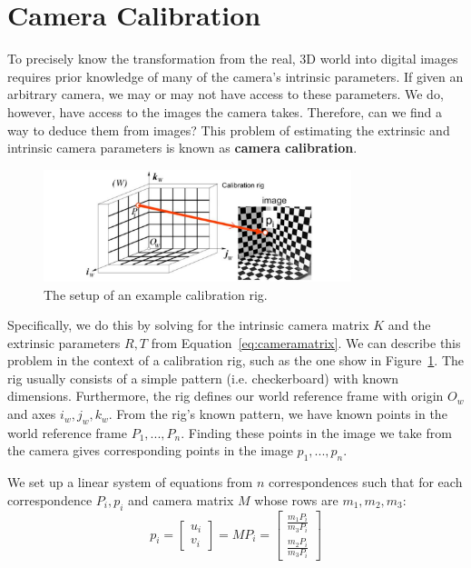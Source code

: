 \documentclass[a4paper, 12pt]{article}
\renewcommand\emph{\textbf}
\begin{document}
\section{Camera Calibration}
To precisely know the transformation from the real, 3D world into digital images requires prior knowledge of many of the camera's intrinsic parameters. If given an arbitrary camera, we may or may not have access to these parameters. We do, however, have access to the images the camera takes. Therefore, can we find a way to deduce them from images? This problem of estimating the extrinsic and intrinsic camera parameters is known as \emph{camera calibration}.

\begin{figure}[h!]
\centering
\includegraphics[width=0.8\textwidth]{figures/1-7.pdf}
\caption{The setup of an example calibration rig.}
\label{fig:calibration}
\end{figure}

Specifically, we do this by solving for the intrinsic camera matrix $K$ and the extrinsic parameters $R,T$ from Equation~\ref{eq:cameramatrix}. We can describe this problem in the context of a calibration rig, such as the one show in Figure~\ref{fig:calibration}. The rig usually consists of a simple pattern (i.e. checkerboard) with known dimensions. Furthermore, the rig defines our world reference frame with origin $O_w$ and axes $i_w, j_w, k_w$. From the rig's known pattern, we have known points in the world reference frame $P_1,...,P_n$. Finding these points in the image we take from the camera gives corresponding points in the image $p_1,...,p_n$. 

We set up a linear system of equations from $n$ correspondences such that for each correspondence $P_i, p_i$ and camera matrix $M$ whose rows are $m_1, m_2, m_3$:
\begin{equation}
p_i = \begin{bmatrix}u_i\\v_i\end{bmatrix} = MP_i = \begin{bmatrix}\frac{m_1 P_i}{m_3P_i}\\\frac{m_2 P_i}{m_3P_i}\end{bmatrix}
\end{equation}
\end{document}
